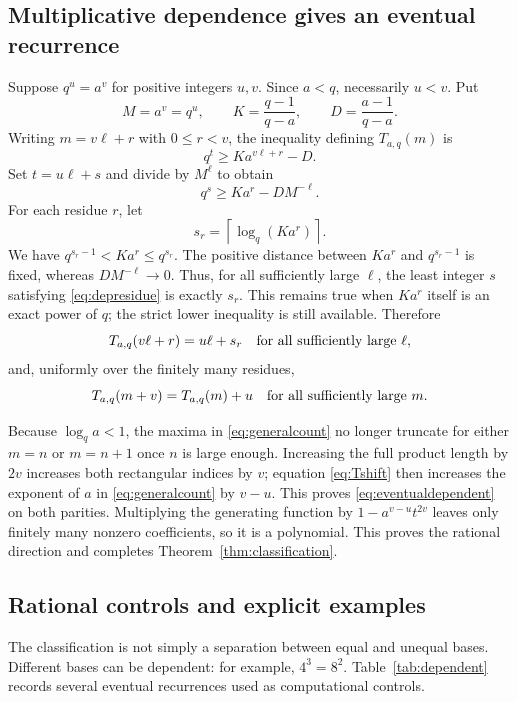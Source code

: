 \documentclass[11pt,letterpaper]{article}
\numberwithin{equation}{section}
\theoremstyle{definition}
\theoremstyle{remark}
\newcommand{\ceil}[1]{\left\lceil#1\right\rceil}
\begin{document}
\subsection{Multiplicative dependence gives an eventual recurrence}
Suppose $q^u=a^v$ for positive integers $u,v$. Since $a<q$, necessarily
$u<v$. Put
\[
 M=a^v=q^u,\qquad K=\frac{q-1}{q-a},\qquad D=\frac{a-1}{q-a}.
\]
Writing $m=v\ell+r$ with $0\le r<v$, the inequality defining
$T_{a,q}(m)$ is
\begin{equation}\label{eq:depfirst}
 q^t\ge K a^{v\ell+r}-D.
\end{equation}
Set $t=u\ell+s$ and divide by $M^\ell$ to obtain
\begin{equation}\label{eq:depresidue}
 q^s\ge K a^r-DM^{-\ell}.
\end{equation}
For each residue $r$, let
\begin{equation}\label{eq:sr}
 s_r=\ceil{\log_q(K a^r)}.
\end{equation}
We have $q^{s_r-1}<K a^r\le q^{s_r}$. The positive distance between
$K a^r$ and $q^{s_r-1}$ is fixed, whereas $DM^{-\ell}\to0$.
Thus, for all sufficiently large $\ell$, the least integer $s$ satisfying
\eqref{eq:depresidue} is exactly $s_r$.
This remains true when $K a^r$ itself is an exact power of $q$; the
strict lower inequality is still available.
Therefore
\begin{equation}\label{eq:thresholdperiod}
 T_{a,q}(v\ell+r)=u\ell+s_r
 \quad\hbox{for all sufficiently large $\ell$},
\end{equation}
and, uniformly over the finitely many residues,
\begin{equation}\label{eq:Tshift}
 T_{a,q}(m+v)=T_{a,q}(m)+u
 \quad\hbox{for all sufficiently large $m$}.
\end{equation}

Because $\log_q a<1$, the maxima in \eqref{eq:generalcount} no longer
truncate for either $m=n$ or $m=n+1$ once $n$ is large enough.
Increasing the full product length by $2v$ increases both rectangular
indices by $v$; equation \eqref{eq:Tshift} then increases the exponent of
$a$ in \eqref{eq:generalcount} by $v-u$. This proves
\eqref{eq:eventualdependent} on both parities.
Multiplying the generating function by $1-a^{v-u}t^{2v}$ leaves only
finitely many nonzero coefficients, so it is a polynomial.
This proves the rational direction and completes
Theorem~\ref{thm:classification}.

\subsection{Rational controls and explicit examples}
The classification is not simply a separation between equal and unequal
bases. Different bases can be dependent: for example, $4^3=8^2$.
Table~\ref{tab:dependent} records several eventual recurrences used as
computational controls.
\end{document}
